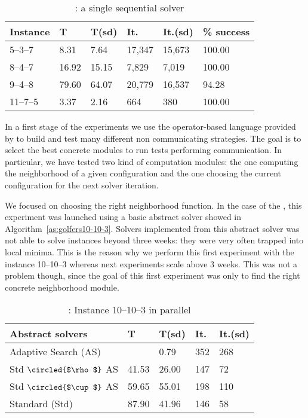 \begin{table}[h]
\centering
\renewcommand{\arraystretch}{1}
\begin{tabular}{p{1.5cm}|R{1.5cm}R{1.5cm}R{1.5cm}R{1.5cm}R{2.5cm}}
\hline
{\bf Instance} & T & T(sd) & It. & It.(sd) & \% success\\
\hline
5--3--7 & 8.31 & 7.64 & 17,347 & 15,673 & 100.00\\
8--4--7 & 16.92 & 15.15 & 7,829 & 7,019 & 100.00\\
9--4--8 & 79.60 & 64.07 & 20,779 & 16,537 & 94.28\\
11--7--5 & 3.37 & 2.16 & 664 & 380 & 100.00\\
\hline
\end{tabular}
\caption{\sg: a single sequential solver}
\label{tab:golfers_seq}
\end{table}

In a first stage of the experiments we use the operator-based language provided by \posl{} to build and test many different non communicating strategies. The goal is to select the best concrete modules to run tests performing communication. In particular, we have tested two kind of computation modules: the one computing the neighborhood of a given configuration and the one choosing the current configuration for the next solver iteration.

We focused on choosing the right neighborhood function. In the case of the \sgp, this experiment was launched using a basic abstract solver showed in Algorithm~\ref{as:golfers10-10-3}.
Solvers implemented from this abstract solver was not able to solve instances beyond three weeks: they were very often trapped into local minima. This is the reason why we perform this first experiment with the instance 10--10--3 whereas next experiments scale above 3 weeks. This was not a problem though, since the goal of this first experiment was only to find the right concrete neighborhood module.

\begin{table}
\centering 
\renewcommand{\arraystretch}{1}
\begin{tabular}{p{4cm}|R{1.3cm}R{1.3cm}R{1.3cm}R{1.3cm}}
\hline
{\bf Abstract solvers} & T & T(sd) & It. & It.(sd) \\
\hline
Adaptive Search (AS) &  & 0.79 & 352 & 268 \\		
Std $\circled{$\rho$}$ AS & 41.53 & 26.00 & 147 & 72\\
Std $\circled{$\cup$}$ AS & 59.65 & 55.01 & 198 & 110\\
Standard (Std) & 87.90 & 41.96 & 146 & 58 \\
\hline
\end{tabular}
\caption{\sg: Instance 10--10--3 in parallel}
\label{tab:golfers10-10-3}
\end{table}

